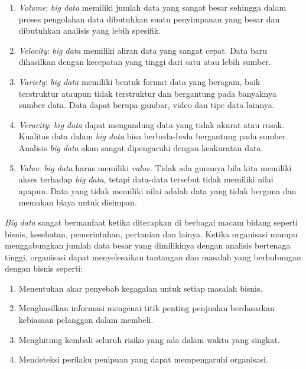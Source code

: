 \begin{enumerate}

\item \textit{Volume}: \textit{big data} memiliki jumlah data yang sangat besar sehingga dalam proses pengolahan data dibutuhkan suatu penyimpanan yang besar dan dibutuhkan analisis yang lebih spesifik.

\item \textit{Velocity}: \textit{big data} memiliki aliran data yang sangat cepat. Data baru dihasilkan dengan kecepatan yang tinggi dari satu atau lebih sumber. 

\item \textit{Variety}: \textit{big data} memiliki bentuk format data yang beragam, baik terstruktur ataupun tidak terstruktur dan bergantung pada banyaknya sumber data. Data dapat berupa gambar, video dan tipe data lainnya.

\item \textit{Veracity}: \textit{big data} dapat mengandung data yang tidak akurat atau rusak. Kualitas  data dalam \textit{big data} bisa berbeda-beda bergantung pada sumber. Analisis \textit{big data} akan sangat dipengaruhi dengan keakuratan data.

\item \textit{Value}: \textit{big data} harus memiliki \textit{value}. Tidak ada gunanya bila kita memiliki akses terhadap \textit{big data}, tetapi data-data tersebut tidak memiliki nilai apapun. Data yang tidak memiliki nilai adalah data yang tidak berguna dan memakan biaya untuk disimpan.

\end{enumerate}

\textit{Big data} sangat bermanfaat ketika diterapkan di berbagai macam bidang seperti bisnis, kesehatan, pemerintahan, pertanian dan lainya. Ketika organisasi mampu menggabungkan jumlah data besar yang dimilikinya dengan analisis bertenaga tinggi, organisasi dapat menyelesaikan tantangan dan masalah yang berhubungan dengan bisnis seperti:

\begin{enumerate}

\item Menentukan akar penyebab kegagalan untuk setiap masalah bisnis.

\item Menghasilkan informasi mengenai titik penting penjualan berdasarkan kebiasaan pelanggan dalam membeli.

\item Menghitung kembali seluruh risiko yang ada dalam waktu yang singkat.

\item Mendeteksi perilaku penipuan yang dapat mempengaruhi organisasi.

\end{enumerate}

